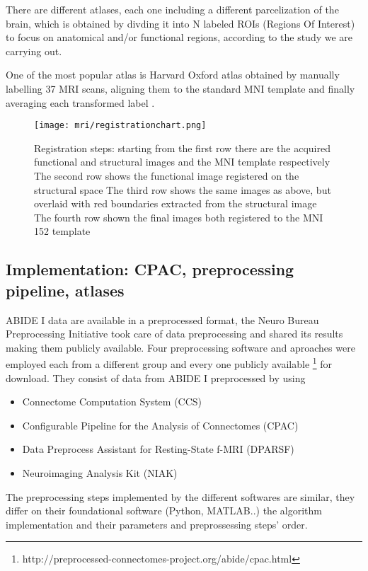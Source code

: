 \documentclass[a4paper,11pt]{article}
\begin{document}
There are different atlases, each one including a different parcelization of the brain, which is obtained by divding it into N labeled ROIs
(Regions Of Interest) to focus on anatomical and/or functional regions, according to the study we are carrying out.


One of the most popular atlas is Harvard Oxford atlas obtained by manually labelling 37 MRI scans, aligning them to the standard MNI template and finally averaging each transformed label \cite{chappell-neuroimaging}.


\begin{figure}
\centering
\texttt{[image: mri/registrationchart.png]}
\caption{Registration steps:
 starting from the first row there are the acquired functional and structural images and the MNI template respectively
 The second row shows the functional image registered on the structural space
 The third row shows the same images as above, but overlaid with red boundaries extracted from the structural image
 The fourth row shown the final images both registered to the MNI 152 template
}
\label{fig:registrationchart}
\end{figure}



\subsection{Implementation: CPAC, preprocessing pipeline, atlases}

ABIDE I data are available in a preprocessed format, the Neuro Bureau Preprocessing Initiative took care of data preprocessing and shared its results making them publicly available.
Four preprocessing software and aproaches were employed each from a different group and every one publicly available \footnote{http://preprocessed-connectomes-project.org/abide/cpac.html} for download.
They consist of data from ABIDE I preprocessed by using
\begin{itemize}
\item Connectome Computation System (CCS)
\item Configurable Pipeline for the Analysis of Connectomes (CPAC)
\item Data Preprocess Assistant for Resting-State f-MRI (DPARSF)
\item Neuroimaging Analysis Kit (NIAK)
\end{itemize}
The preprocessing steps implemented by the different softwares are similar, they differ on their foundational software (Python, MATLAB..) the algorithm implementation and their parameters and preprossessing steps' order.
\end{document}
